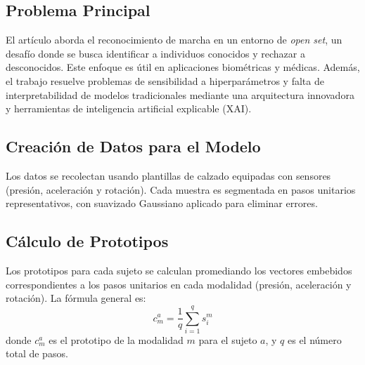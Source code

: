 \documentclass{report}
\begin{document}
\subsection{Problema Principal}
El artículo aborda el reconocimiento de marcha en un entorno de \textit{open set}, un desafío donde se busca identificar a individuos conocidos y rechazar a desconocidos. Este enfoque es útil en aplicaciones biométricas y médicas. Además, el trabajo resuelve problemas de sensibilidad a hiperparámetros y falta de interpretabilidad de modelos tradicionales mediante una arquitectura innovadora y herramientas de inteligencia artificial explicable (XAI).

\subsection{Creación de Datos para el Modelo}
Los datos se recolectan usando plantillas de calzado equipadas con sensores (presión, aceleración y rotación). Cada muestra es segmentada en pasos unitarios representativos, con suavizado Gaussiano aplicado para eliminar errores.

\subsection{Cálculo de Prototipos}
Los prototipos para cada sujeto se calculan promediando los vectores embebidos correspondientes a los pasos unitarios en cada modalidad (presión, aceleración y rotación). La fórmula general es:
\[
c_m^a = \frac{1}{q} \sum_{i=1}^q s_i^m
\]
donde \(c_m^a\) es el prototipo de la modalidad \(m\) para el sujeto \(a\), y \(q\) es el número total de pasos.
\end{document}
